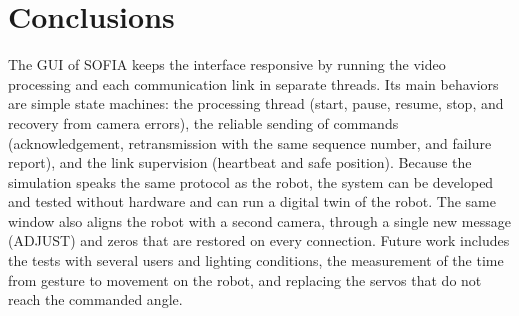 \documentclass[lettersize,journal]{IEEEtran}
\begin{document}
	\section{Conclusions}

	The GUI of SOFIA keeps the interface responsive by running the video processing and each communication link in separate threads. Its main behaviors are simple state machines: the processing thread (start, pause, resume, stop, and recovery from camera errors), the reliable sending of commands (acknowledgement, retransmission with the same sequence number, and failure report), and the link supervision (heartbeat and safe position). Because the simulation speaks the same protocol as the robot, the system can be developed and tested without hardware and can run a digital twin of the robot. The same window also aligns the robot with a second camera, through a single new message (ADJUST) and zeros that are restored on every connection. Future work includes the tests with several users and lighting conditions, the measurement of the time from gesture to movement on the robot, and replacing the servos that do not reach the commanded angle.

	\balance

	
	
\end{document}
